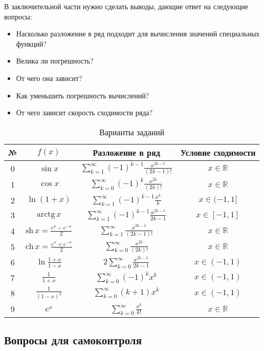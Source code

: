 В заключительной части нужно сделать выводы, дающие ответ на следующие
вопросы:
\begin{itemize}
\item Насколько разложение в ряд подходит для вычисления значений специальных
функций?
\item Велика ли погрешность?
\item От чего она зависит?
\item Как уменьшить погрешность вычислений?
\item От чего зависит скорость сходимости ряда? 
\end{itemize}
\begin{table}
\begin{centering}
\begin{tabular}{|c|c|c|c|}
\hline 
№ & $f(x)$ & Разложение в ряд & Условие сходимости\tabularnewline
\hline 
\hline 
0\vphantom{$\Biggl(\Biggr)$} & $\sin x$ & $\sum_{k=1}^{\infty}(-1)^{k-1}\frac{x^{2k-1}}{(2k-1)!}$ & $x\in\mathbb{R}$\tabularnewline
\hline 
1\vphantom{$\Biggl(\Biggr)$} & $\cos x$ & $\sum_{k=0}^{\infty}(-1)^{k}\frac{x^{2k}}{(2k)!}$ & $x\in\mathbb{R}$\tabularnewline
\hline 
2\vphantom{$\Biggl(\Biggr)$} & $\ln(1+x)$ & $\sum_{k=1}^{\infty}(-1)^{k-1}\frac{x^{k}}{k}$ & $x\in(-1,1]$\tabularnewline
\hline 
3\vphantom{$\Biggl(\Biggr)$} & $\mathrm{arctg}\, x$ & $\sum_{k=1}^{\infty}(-1)^{k-1}\frac{x^{2k-1}}{2k-1}$ & $x\in[-1,1]$\tabularnewline
\hline 
4\vphantom{$\Biggl(\Biggr)$} & $\mathrm{sh}\, x=\frac{e^{x}-e^{-x}}{2}$ & $\sum_{k=1}^{\infty}\frac{x^{2k-1}}{(2k-1)!}$ & $x\in\mathbb{R}$\tabularnewline
\hline 
5\vphantom{$\Biggl(\Biggr)$} & $\mathrm{ch}\, x=\frac{e^{x}+e^{-x}}{2}$ & $\sum_{k=0}^{\infty}\frac{x^{2k}}{(2k)!}$ & $x\in\mathbb{R}$\tabularnewline
\hline 
6\vphantom{$\Biggl(\Biggr)$} & $\ln\frac{1+x}{1-x}$ & $2\sum_{k=0}^{\infty}\frac{x^{2k-1}}{2k-1}$ & $x\in(-1,1)$\tabularnewline
\hline 
7\vphantom{$\Biggl(\Biggr)$} & $\frac{1}{1+x}$ & $\sum_{k=0}^{\infty}(-1)^{k}x^{k}$ & $x\in(-1,1)$\tabularnewline
\hline 
8\vphantom{$\Biggl(\Biggr)$} & $\frac{1}{(1-x)^{2}}$ & $\sum_{k=0}^{\infty}(k+1)x^{k}$ & $x\in(-1,1)$\tabularnewline
\hline 
9\vphantom{$\Biggl(\Biggr)$} & $e^{x}$ & $\sum_{k=0}^{\infty}\frac{x^{k}}{k!}$ & $x\in\mathbb{R}$\tabularnewline
\hline 
\end{tabular}
\par\end{centering}

\caption{Варианты заданий}
\end{table}



\subsection{Вопросы для самоконтроля}

